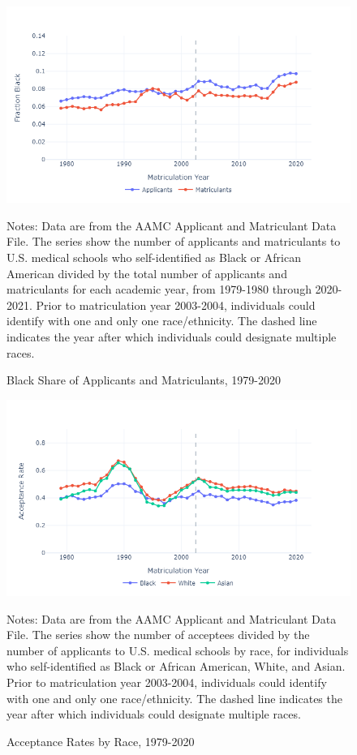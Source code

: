 \documentclass[12pt]{article}
\begin{document}
\begin{figure}[hp]
   \centering
   \caption{Black Share of Applicants and Matriculants, 1979-2020}
   \label{fig:app_blackshare}
   \includegraphics[width=\textwidth]{figs/matriculant_frac_black.png}
   \begin{minipage}{0.9\textwidth}
   \footnotesize Notes: Data are from the AAMC Applicant and Matriculant Data File. The series show the number of applicants and matriculants to U.S. medical schools who self-identified as Black or African American divided by the total number of applicants and matriculants for each academic year, from 1979-1980 through 2020-2021. Prior to matriculation year 2003-2004, individuals could identify with one and only one race/ethnicity. The dashed line indicates the year after which individuals could designate multiple races. 
   \end{minipage}
  \end{figure}


  \begin{figure}[hp]
   \centering
   \caption{Acceptance Rates by Race, 1979-2020}
   \label{fig:acceptance}
   \includegraphics[width=\textwidth]{figs/acceptance_rate_byrace.png}
   \begin{minipage}{0.9\textwidth}
   \footnotesize Notes: Data are from the AAMC Applicant and Matriculant Data File. The series show the number of acceptees divided by the number of applicants to U.S. medical schools by race, for individuals who self-identified as Black or African American, White, and Asian. Prior to matriculation year 2003-2004, individuals could identify with one and only one race/ethnicity. The dashed line indicates the year after which individuals could designate multiple races. 
   \end{minipage}
  \end{figure}
\end{document}
